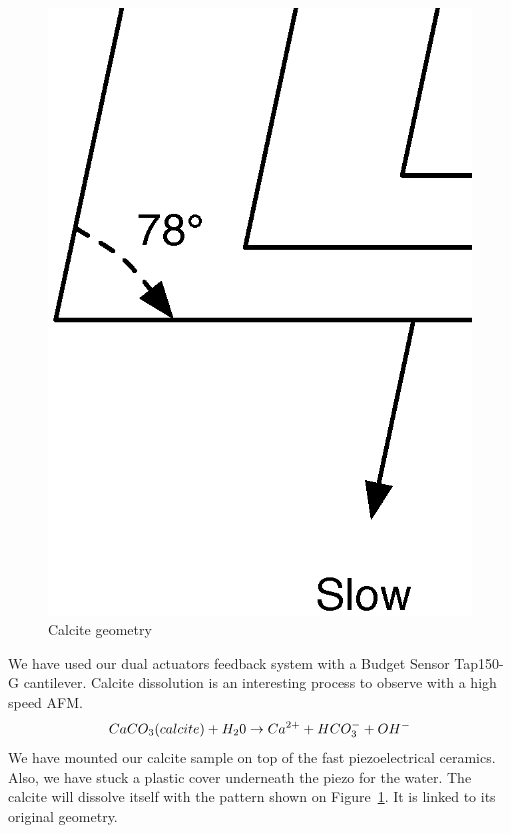 \begin{figure}[H]
  \centering
  \includegraphics[scale=0.3]{images/calcitegeometry.eps}
    \caption{Calcite geometry}
  \label{fig:calcitegeometry}
\end{figure}
We have used our dual actuators feedback system with a Budget Sensor Tap150-G cantilever. Calcite dissolution is an interesting process to observe with a high speed AFM.
\begin{equation}\label{calcite}
\centering
	CaCO_3(calcite) + H_20 \rightarrow Ca^{2+} + HCO_3^- + OH^- 
\end{equation}
We have mounted our calcite sample on top of the fast piezoelectrical ceramics. Also, we have stuck a plastic cover underneath the piezo for the water. The calcite will dissolve itself with the pattern shown on Figure~\ref{fig:calcitegeometry}. It is linked to its original geometry.
